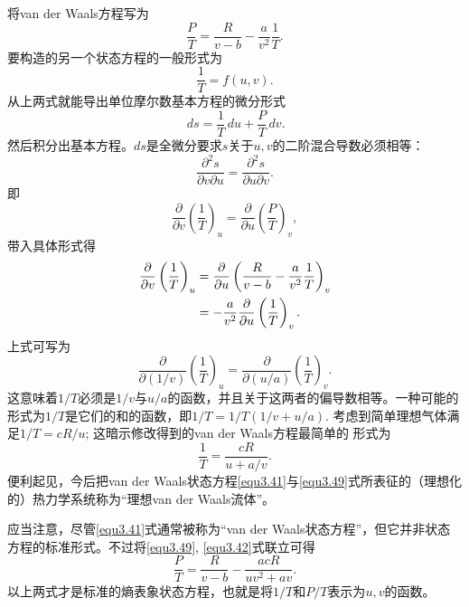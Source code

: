 将van der Waals方程写为
\begin{equation}
	\frac{P}{T} = \frac{R}{v - b} - \frac{a}{v^2} \frac{1}{T}.
\label{equ3.42}
\end{equation}
要构造的另一个状态方程的一般形式为
\begin{equation}
	\frac{1}{T} = f(u, v).
\label{equ3.43}
\end{equation}
从上两式就能导出单位摩尔数基本方程的微分形式
\begin{equation}
	\mathrm \,ds = \frac{1}{T}\mathrm \,du + \frac{P}{T}\mathrm \,dv.
\label{equ3.44}
\end{equation}
然后积分出基本方程。$ds$是全微分要求$s$关于$u, v$的二阶混合导数必须相等：
\begin{equation}
	\frac{\partial^2 s}{\partial v \partial u} = \frac{\partial^2 s}{\partial u \partial v}.
\label{equ3.45}
\end{equation}
即
\begin{equation}
    \frac{\partial}{\partial v} \left( \frac{1}{T} \right)_u = \frac{\partial}{\partial u} \left( \frac{P}{T} \right)_v,
\label{equ3.46}
\end{equation}
带入具体形式得
\begin{align}
    \frac{\partial}{\partial v} \left( \frac{1}{T} \right)_u &= \frac{\partial}{\partial u} \left( \frac{R}{v - b} - \frac{a}{v^2} \frac{1}{T} \right)_v \notag \\
    &= -\frac{a}{v^2} \frac{\partial}{\partial u} \left( \frac{1}{T} \right)_v.
\label{equ3.47}
\end{align}
上式可写为
\begin{equation}
    \frac{\partial}{\partial (1/v)} \left( \frac{1}{T} \right)_u = \frac{\partial}{\partial(u/a)} \left( \frac{1}{T} \right)_v.
\label{equ3.48}
\end{equation}
这意味着$1/T$必须是$1/v$与$u/a$的函数，并且关于这两者的偏导数相等。一种可能的形式为$1/T$是它们的和的函数，即$1/T = 1/T(1/v + u/a)$. 考虑到简单理想气体满足$1/T = cR/u$; 这暗示修改得到的van der Waals方程最简单的 形式为
\begin{equation}
    \frac{1}{T} = \frac{cR}{u + a/v}.
\label{equ3.49}
\end{equation}
便利起见，今后把van der Waals状态方程\eqref{equ3.41}与\eqref{equ3.49}式所表征的（理想化的）热力学系统称为“理想van der Waals流体”。

应当注意，尽管\eqref{equ3.41}式通常被称为“van der Waals状态方程”，但它并非状态方程的标准形式。不过将\eqref{equ3.49}, \eqref{equ3.42}式联立可得
\begin{equation}
    \frac{P}{T} = \frac{R}{v - b} - \frac{acR}{uv^2 + av}.
\label{equ3.50}
\end{equation}
以上两式才是标准的熵表象状态方程，也就是将$1/T$和$P/T$表示为$u, v$的函数。

